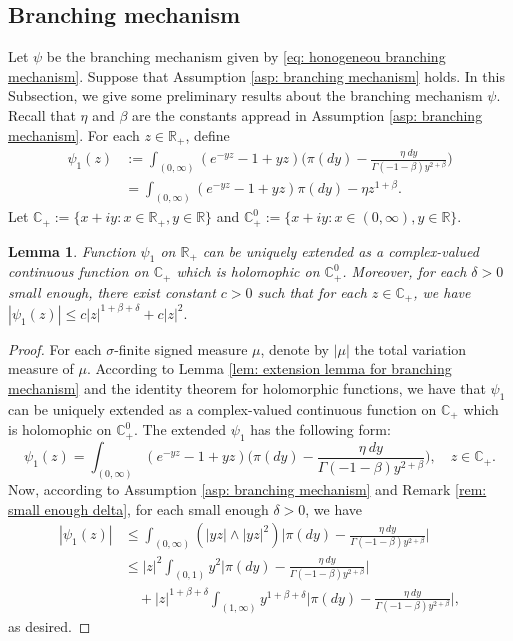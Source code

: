 \documentclass[12pt,a4paper]{amsart}
\theoremstyle{plain}
\newtheorem{lem}[thm]{Lemma}
\theoremstyle{definition}
\numberwithin{equation}{section}
\begin{document}
\subsection{Branching mechanism}
\label{sec: branching mechanism}
	Let $\psi$ be the branching mechanism given by \eqref{eq: honogeneou branching mechanism}. 
	Suppose that Assumption \ref{asp: branching mechanism} holds. 
	In this Subsection, we give some preliminary results about the branching mechanism $\psi$.
	Recall that $\eta$ and $\beta$ are the constants appread in Assumption \ref{asp: branching mechanism}.
	For each $z\in \mathbb R_+$, define
\begin{align}
	\psi_1(z) 
	&:= \int_{(0,\infty)}(e^{-yz}-1+yz) \Big(\pi(dy) - \frac{\eta~dy}{\Gamma(-1-\beta)y^{2+\beta}}\Big)
	\\&= \int_{(0,\infty)}(e^{-yz}-1+yz) \pi(dy) -  \eta z^{1+\beta}.
\end{align}
	Let $\mathbb C_+:= \{x+iy: x\in \mathbb R_+, y \in \mathbb R\}$ and $\mathbb C^0_+:= \{x+iy: x\in (0,\infty), y \in \mathbb R\}$.
\begin{lem}
\label{lem: complex extension for psi1}
	Function $\psi_1$ on $\mathbb R_+$ can be uniquely extended as a complex-valued continuous function on $\mathbb C_+$ which is holomophic on $\mathbb C^0_+$. 
	Moreover, for each $\delta > 0$ small enough, there exist constant $c>0$ such that for each $z\in \mathbb C_+$, we have
$
	|\psi_1(z)| \leq c |z|^{1+\beta+\delta} + c|z|^2.
$
\end{lem}
\begin{proof}
	For each $\sigma$-finite signed measure $\mu$, denote by $|\mu|$ the total variation measure of $\mu$.	
	According to Lemma \ref{lem: extension lemma for branching mechanism} and the identity theorem for holomorphic functions, we have that $\psi_1$ can be uniquely extended as a complex-valued continuous function on $\mathbb C_+$ which is holomophic on $\mathbb C^0_+$.
	The extended $\psi_1$ has the following form:
\[
	\psi_1(z)= \int_{(0,\infty)}(e^{-yz}-1+yz) \Big(\pi(dy) - \frac{\eta~dy}{\Gamma(-1-\beta)y^{2+\beta}}\Big),
	\quad z\in \mathbb C_+.
\]
	Now, according to  Assumption \ref{asp: branching mechanism} and Remark \ref{rem: small enough delta}, for each small enough $\delta > 0$, we have
\begin{align}
	|\psi_1(z)| 
	&\leq \int_{(0,\infty)} (|yz|\wedge |yz|^2) \Big|\pi(dy) - \frac{\eta~dy}{\Gamma(-1-\beta)y^{2+\beta}}\Big|
	\\&\leq  |z|^2\int_{(0,1)} y^2 \Big|\pi(dy) - \frac{\eta~dy}{\Gamma(-1-\beta)y^{2+\beta}}\Big| 
	\\&\quad + |z|^{1+\beta +\delta}\int_{(1,\infty)} y^{1+\beta + \delta} \Big|\pi(dy) - \frac{\eta~dy}{\Gamma(-1-\beta)y^{2+\beta}}\Big|,
\end{align}
	as desired.
\end{proof}
\end{document}
